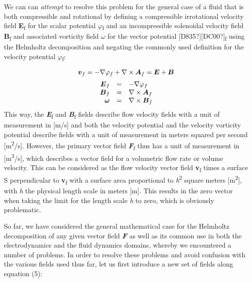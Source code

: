 \documentclass[a4paper]{article}
\newcommand\textstyleNone[1]{#1}
\newcommand\boldsubformula[1]{\text{\mathversion{bold}$#1$}}
\begin{document}
{
\textstyleNone{{We can
}{can
}\textit{{attempt}}{
to }{resolve this problem for the general case of a fluid that is
both compressible and rotational by defining a compressible irrotational velocity field
}\textbf{{E}}{\textsubscript{f}}{
for the scalar potential}\textbf{{
}}{$\varphi
$}{\textsubscript{f}}\textbf{{
}}{and an incompressible solenoidal velocity field
}\textbf{{B}}{\textsubscript{f}}{
and associated vorticity field }\textbf{{$\omega
$}}{ for the vector potential
}{[D835?][DC00?]}{\textsubscript{f}}{
using the Helmholtz decomposition and negating the commonly used definition for the velocity potential
}{$\varphi
$}{\textsubscript{f}}{:}}}

\begin{equation}
\boldsubformula v_f=-\nabla \varphi _f+\nabla \times \boldsubformula A_f=\boldsubformula E+\boldsubformula B
\end{equation}
\begin{equation}
\begin{matrix}\hfill \boldsubformula E_f&=&-\nabla \varphi _f\hfill\null \\\hfill \boldsubformula B_f&=&\nabla \times
\boldsubformula A_f\hfill\null \\\hfill \boldsubformula{\omega }&=&\nabla \times \boldsubformula B_f\hfill\null
\end{matrix}
\end{equation}
{
\textstyleNone{{This way, the
}\textbf{\textit{{E}}}{\textsubscript{f}}{
and
}\textbf{\textit{{B}}}{\textsubscript{f}}{
fields
}{describe}{
}{flow velocity fields with a unit of measurement in [m/s]
}{and }{both
the velocity potential and the }{velocity
}{vorticity potential
}{describe
}{fields }{with
a}{ unit of measurement in meters squared per second
[m}{\textsuperscript{2}}{/s].
}{However, the primary vector field
}\textbf{\textit{{F}}}{\textsubscript{f
}}{thus has a
}{unit of measurement in
[m}{\textsuperscript{3}}{/s],
which describes a vector field for a volumetric flow rate or volume velocity. This can be considered as the flow
velocity vector field
}\textbf{{v}}{\textsubscript{f}}{
times a surface
}{S}{
perpendicular to
}\textbf{{v}}{\textsubscript{f}}{
with a surface area proportional to
}\textit{{h}}{\textsuperscript{2}}{
square meters
[m}{\textsuperscript{2}}{],
with
}\textit{{h}}{
the }physical length scale in meters [m]. This results in the zero vector when taking the limit for the length scale
\textit{h} to zero, which is obviously problematic.}}

{
\textstyleNone{So far, we have considered the general mathematical case for the Helmholtz decomposition of any given
vector field \textbf{\textit{F}} as well as its common use in both the electrodynamics and the fluid dynamics domains,
whereby we encountered a number of problems.  In order to resolve these problems and avoid confusion with the various
fields used thus far, let us first introduce a new set of fields
along{ equation
}{(5)}{:}{
}}}
\end{document}
